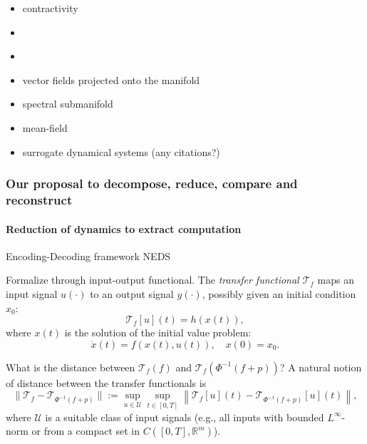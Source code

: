 \documentclass{article}
\newcommand{\ascomment}[1]{\textcolor{ascolor}{(#1)}}
\theoremstyle{definition} \newtheorem{definition}{Definition}  \newtheorem{example}{Example}
\theoremstyle{remark} \newtheorem{remark}{Remark}
\newcommand{\reals}{\mathbb{R}}
\newcounter{ct}
\begin{document}
\begin{itemize}
\item contractivity \citep{lohmiller1998contraction}\citep{bullo2023contraction} \citep{revay2020contracting} \citep{tsukamoto2021contraction} \citep{davydov2022rnn, davydov2024noneuclidean}
\item \citep{li2021novel}
\item \citep{otto2023learning}
\item vector fields projected onto the manifold \citep{roy2021extracting, luo2023noncanonical}
\item spectral submanifold \citep{cenedese2022data, axaas2023fast, bettini2024model, kaszas2024data}
\item mean-field\citep{bick2020understanding}
\item surrogate dynamical systems (any citations?)
\end{itemize}



\subsubsection{Our proposal to decompose, reduce, compare and reconstruct}
\paragraph{Reduction of dynamics to extract computation}
Encoding-Decoding framework
\citep{zhang2025neural} NEDS

Formalize through input-output functional.
The \emph{transfer functional} \( \mathcal{T}_f \) maps an input signal \( u(\cdot) \) to an output signal \( y(\cdot) \), possibly given an initial condition \( x_0 \):
\[
\mathcal{T}_f[u](t) = h(x(t)),
\]
where \( x(t) \) is the solution of the initial value problem:
\[
\dot{x}(t) = f(x(t), u(t)), \quad x(0) = x_0.
\]

What is the distance between $\mathcal{T}_f(f)$ and $\mathcal{T}_f(\Phi^{-1}(f+p))$?
A natural notion of distance between the transfer functionals is
\[
\|\mathcal{T}_f - \mathcal{T}_{\Phi^{-1}(f+p)}\| 
:= \sup_{u \in \mathcal{U}} \sup_{t \in [0, T]} 
\left\| \mathcal{T}_f[u](t) - \mathcal{T}_{\Phi^{-1}(f+p)}[u](t) \right\|,
\]
where \( \mathcal{U} \) is a suitable class of input signals (e.g., all inputs with bounded \( L^\infty \)-norm or from a compact set in \( C([0,T], \mathbb{R}^m) \)).

\end{document}
